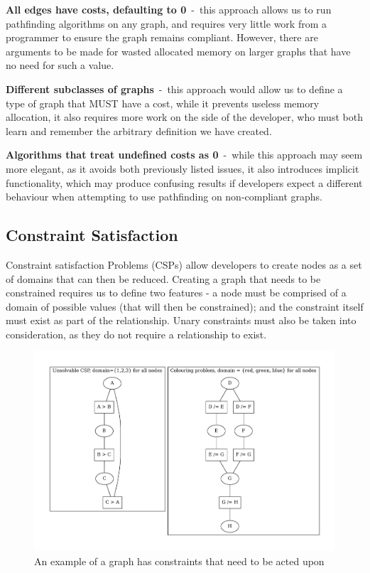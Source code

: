 \textbf{All edges have costs, defaulting to 0}~-~this approach allows us to run pathfinding algorithms on any graph, and
requires very little work from a programmer to ensure the graph remains compliant.
However, there are arguments to be made for wasted allocated memory on larger graphs that have no need for such a value.

\textbf{Different subclasses of graphs}~-~this approach would allow us to define a type of graph that MUST have a cost,
while it prevents useless memory allocation, it also requires more work on the side of the developer, who must both
learn and remember the arbitrary definition we have created.

\textbf{Algorithms that treat undefined costs as 0}~-~while this approach may seem more elegant, as it avoids both
previously listed issues, it also introduces implicit functionality, which may produce confusing results if developers
expect a different behaviour when attempting to use pathfinding on non-compliant graphs.

\subsection{Constraint Satisfaction}\label{subsec:constraint-satisfaction}
Constraint satisfaction Problems (CSPs) allow developers to create nodes as a set of domains that can then be reduced.
Creating a graph that needs to be constrained requires us to define two features - a node must be comprised of a domain
of possible values (that will then be constrained); and the constraint itself must exist as part of the relationship.
Unary constraints must also be taken into consideration, as they do not require a relationship to exist.

\begin{figure}[H]
    \centering
    \includegraphics[width=12cm]{figures/example_graphs/constraint_satisfaction.gv}
    \caption{An example of a graph has constraints that need to be acted upon}
    \label{fig:example_constraint_graph}
\end{figure}

